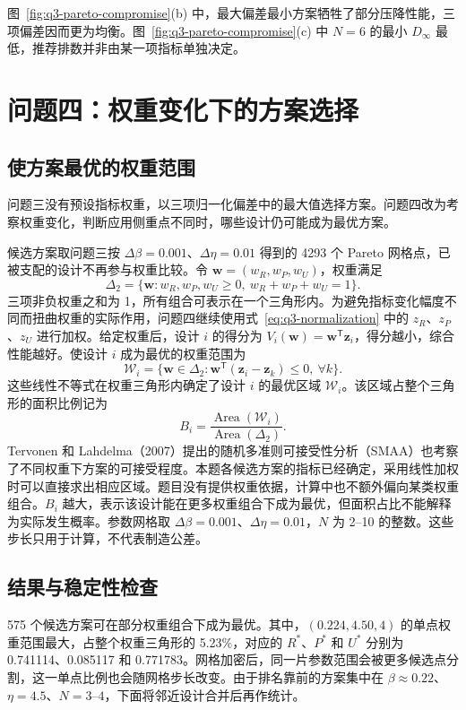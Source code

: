 \documentclass[withoutpreface,bwprint]{cumcmthesis}
\newcommand{\Rstar}{R^{*}}
\newcommand{\Pstar}{P^{*}}
\newcommand{\Ustar}{U^{*}}
\newcommand{\vect}[1]{\bm{#1}}
\begin{document}
图~\ref{fig:q3-pareto-compromise}(b) 中，最大偏差最小方案牺牲了部分压降性能，三项偏差因而更为均衡。图~\ref{fig:q3-pareto-compromise}(c) 中 $N=6$ 的最小 $D_\infty$ 最低，推荐排数并非由某一项指标单独决定。

\section{问题四：权重变化下的方案选择}
\subsection{使方案最优的权重范围}
问题三没有预设指标权重，以三项归一化偏差中的最大值选择方案。问题四改为考察权重变化，判断应用侧重点不同时，哪些设计仍可能成为最优方案。

候选方案取问题三按 $\Delta\beta=0.001$、$\Delta\eta=0.01$ 得到的 4293 个 Pareto 网格点，已被支配的设计不再参与权重比较。令 $\vect w=(w_R,w_P,w_U)$，权重满足
\begin{equation}
\Delta_2=\{\vect w:w_R,w_P,w_U\geq0,\ w_R+w_P+w_U=1\}.
\end{equation}
三项非负权重之和为 1，所有组合可表示在一个三角形内。为避免指标变化幅度不同而扭曲权重的实际作用，问题四继续使用式~\eqref{eq:q3-normalization} 中的 $z_R$、$z_P$、$z_U$ 进行加权。给定权重后，设计 $i$ 的得分为 $V_i(\vect w)=\vect w^{\mathsf T}\vect z_i$，得分越小，综合性能越好。使设计 $i$ 成为最优的权重范围为
\begin{equation}
\mathcal W_i=\{\vect w\in\Delta_2:\vect w^{\mathsf T}(\vect z_i-\vect z_k)\leq0,\ \forall k\}.
\end{equation}
这些线性不等式在权重三角形内确定了设计 $i$ 的最优区域 $\mathcal W_i$。该区域占整个三角形的面积比例记为
\begin{equation}
B_i=\frac{\operatorname{Area}(\mathcal W_i)}{\operatorname{Area}(\Delta_2)}.
\end{equation}
Tervonen 和 Lahdelma（2007）提出的随机多准则可接受性分析（SMAA）也考察了不同权重下方案的可接受程度\cite{Tervonen2007}。本题各候选方案的指标已经确定，采用线性加权时可以直接求出相应区域。题目没有提供权重依据，计算中也不额外偏向某类权重组合。$B_i$ 越大，表示该设计能在更多权重组合下成为最优，但面积占比不能解释为实际发生概率。参数网格取 $\Delta\beta=0.001$、$\Delta\eta=0.01$，$N$ 为 2--10 的整数。这些步长只用于计算，不代表制造公差。

\subsection{结果与稳定性检查}
575 个候选方案可在部分权重组合下成为最优。其中，$(0.224,4.50,4)$ 的单点权重范围最大，占整个权重三角形的 5.23\%，对应的 $\Rstar$、$\Pstar$ 和 $\Ustar$ 分别为 0.741114、0.085117 和 0.771783。网格加密后，同一片参数范围会被更多候选点分割，这一单点比例也会随网格步长改变。由于排名靠前的方案集中在 $\beta\approx0.22$、$\eta=4.5$、$N=3$--$4$，下面将邻近设计合并后再作统计。
\end{document}
